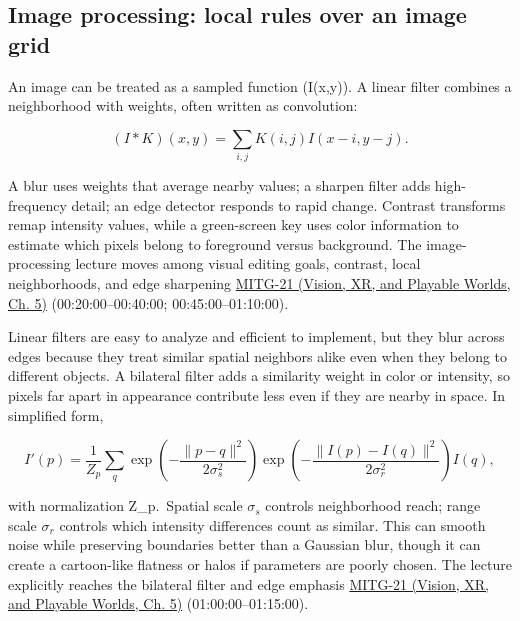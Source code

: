 \subsection{Image processing: local rules over an image grid}\label{03-visual-computing-i-ch004-image-processing-local-rules-over-an-image-grid}

\hypertarget{03-visual-computing-i-ch004-image-processing-local-rules-over-an-image-grid}{}

An image can be treated as a sampled function (I(x,y)). A linear filter combines a neighborhood with weights, often written as convolution:

\[
(I*K)(x,y)=\sum_{i,j}K(i,j)I(x-i,y-j).
\]

A blur uses weights that average nearby values; a sharpen filter adds high-frequency detail; an edge detector responds to rapid change. Contrast transforms remap intensity values, while a green-screen key uses color information to estimate which pixels belong to foreground versus background. The image-processing lecture moves among visual editing goals, contrast, local neighborhoods, and edge sharpening \href{../07-Vision-XR-and-Playable-Worlds/main.pdf\#nameddest=04-visual-computing-ii-ch036-mitg-21---image-processing}{MITG-21 (Vision, XR, and Playable Worlds, Ch. 5)} (00:20:00--00:40:00; 00:45:00--01:10:00).

Linear filters are easy to analyze and efficient to implement, but they blur across edges because they treat similar spatial neighbors alike even when they belong to different objects. A bilateral filter adds a similarity weight in color or intensity, so pixels far apart in appearance contribute less even if they are nearby in space. In simplified form,

\[
I'(p)=\frac{1}{Z_p}\sum_q \exp\!\left(-\frac{\|p-q\|^2}{2\sigma_s^2}\right)\exp\!\left(-\frac{\|I(p)-I(q)\|^2}{2\sigma_r^2}\right)I(q),
\]

with normalization Z\_p.~Spatial scale \(\sigma_s\) controls neighborhood reach; range scale \(\sigma_r\) controls which intensity differences count as similar. This can smooth noise while preserving boundaries better than a Gaussian blur, though it can create a cartoon-like flatness or halos if parameters are poorly chosen. The lecture explicitly reaches the bilateral filter and edge emphasis \href{../07-Vision-XR-and-Playable-Worlds/main.pdf\#nameddest=04-visual-computing-ii-ch036-mitg-21---image-processing}{MITG-21 (Vision, XR, and Playable Worlds, Ch. 5)} (01:00:00--01:15:00).

